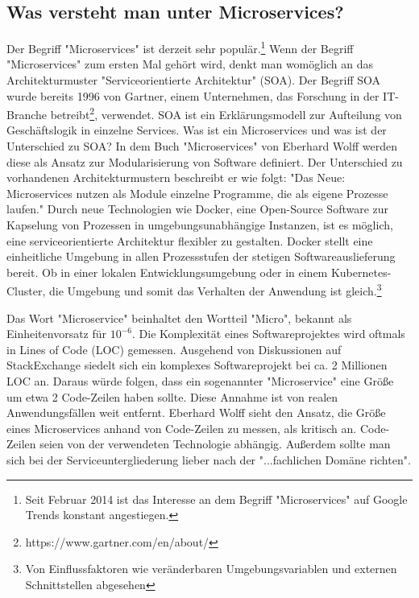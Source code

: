 \subsection{Was versteht man unter Microservices?}
\label{subsec:wasverstehtmanuntermicroservices}
Der Begriff "Microservices" ist derzeit sehr populär.\footnote{Seit Februar 2014 ist das Interesse
an dem Begriff "Microservices" auf Google Trends konstant angestiegen.\cite{MicroservicesGoogleTrends}}
Wenn der Begriff "Microservices" zum ersten Mal gehört wird, denkt man womöglich an das Architekturmuster
"Serviceorientierte Architektur" (SOA). Der Begriff SOA wurde bereits 1996
von Gartner, einem Unternehmen, das Forschung in der IT-Branche
betreibt\footnote{https://www.gartner.com/en/about/}, verwendet.\cite{GartnerSOAPart1}
SOA ist ein Erklärungsmodell zur Aufteilung von Geschäftslogik in einzelne Services.
Was ist ein Microservices und was ist der Unterschied zu SOA?
In dem Buch "Microservices" von Eberhard Wolff werden diese als Ansatz zur Modularisierung
von Software definiert. Der Unterschied zu vorhandenen Architekturmustern beschreibt er wie folgt:
"Das Neue: Microservices nutzen als Module einzelne
Programme, die als eigene Prozesse laufen."\cite[S. 2]{MicroservicesBook}
Durch neue Technologien wie Docker, eine Open-Source Software
zur Kapselung von Prozessen in umgebungsunabhängige Instanzen, \cite{DockerOverview}
ist es möglich, eine serviceorientierte Architektur flexibler
zu gestalten. Docker stellt eine einheitliche Umgebung in
allen Prozessstufen der stetigen Softwareauslieferung bereit.
Ob in einer lokalen Entwicklungsumgebung oder in einem
Kubernetes-Cluster, die Umgebung und somit das
Verhalten der Anwendung ist gleich.\footnote{Von Einflussfaktoren
wie veränderbaren Umgebungsvariablen und externen Schnittstellen abgesehen}

Das Wort "Microservice" beinhaltet den Wortteil "Micro",
bekannt als Einheitenvorsatz für \(10^{-6}\). Die Komplexität eines Softwareprojektes
wird oftmals in Lines of Code (LOC) gemessen. Ausgehend
von Diskussionen auf StackExchange siedelt sich ein komplexes Softwareprojekt bei
ca. 2 Millionen LOC an.\cite{ProjectsizeStackexchange}
Daraus würde folgen, dass ein sogenannter "Microservice" eine Größe um etwa
2 Code-Zeilen haben sollte. Diese Annahme ist von realen
Anwendungsfällen weit entfernt. Eberhard Wolff sieht den Ansatz,
die Größe eines Microservices anhand von Code-Zeilen zu
messen, als kritisch an. Code-Zeilen seien von der verwendeten
Technologie abhängig. Außerdem sollte man sich bei der
Serviceuntergliederung lieber nach der "...fachlichen Domäne richten".\cite[S. 31 und 32]{MicroservicesBook}

